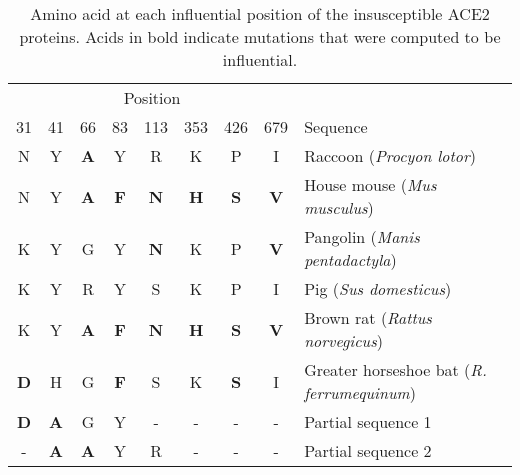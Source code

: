 \captionsetup{width=.72\textwidth}
\begin{table*}[t]
  \centering
  \begin{tabular}[t]{ cccccccc l }
    \hline
      \multicolumn{8}{c}{Position} \\
    \cline{1-8}
      31&41&66&83&113&353&426&679& Sequence\\
    \hline
      N&Y&\textbf{A}&Y&R&K&P&I& Raccoon (\emph{Procyon lotor}) \\
      N&Y&\textbf{A}&\textbf{F}&\textbf{N}&\textbf{H}&\textbf{S}&\textbf{V}& House mouse (\emph{Mus musculus}) \\
      K&Y&G&Y&\textbf{N}&K&P&\textbf{V}& Pangolin (\emph{Manis pentadactyla}) \\
      K&Y&R&Y&S&K&P&I& Pig (\emph{Sus domesticus}) \\
      K&Y&\textbf{A}&\textbf{F}&\textbf{N}&\textbf{H}&\textbf{S}&\textbf{V}& Brown rat (\emph{Rattus norvegicus}) \\
      \textbf{D}&H&G&\textbf{F}&S&K&\textbf{S}&I& Greater horseshoe bat (\emph{R. ferrumequinum}) \\
      \textbf{D}&\textbf{A}&G&Y&-&-&-&-& Partial sequence 1 \\
      -&\textbf{A}&\textbf{A}&Y&R&-&-&-& Partial sequence 2 \\
    \hline
  \end{tabular}
  \caption{Amino acid at each influential position of the insusceptible ACE2 proteins. Acids in bold indicate mutations that were computed to be influential.}
\end{table*}
\captionsetup{width=.475\textwidth}
